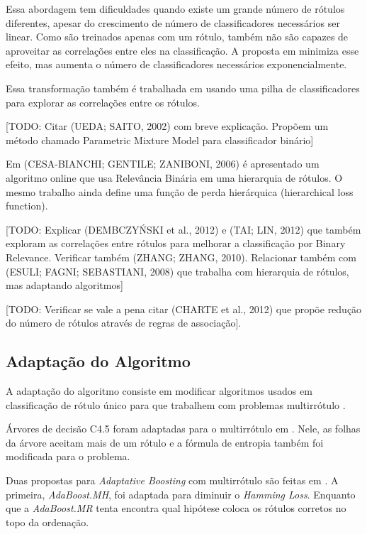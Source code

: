 \documentclass[runningheads,a4paper]{llncs}
\begin{document}
Essa abordagem tem dificuldades quando existe um grande número de rótulos diferentes, apesar do crescimento de número de classificadores necessários ser linear. Como são treinados apenas com um rótulo, também não são capazes de aproveitar as correlações entre eles na classificação. A proposta em \cite{Hullermeier2008-co} minimiza esse efeito, mas aumenta o número de classificadores necessários exponencialmente.

Essa transformação também é trabalhada em \cite{Tsoumakas2009-ex} usando uma pilha de classificadores para explorar as correlações entre os rótulos.

[TODO: Citar (UEDA; SAITO, 2002)\cite{Ueda2002-gd} com breve explicação. Propõem um método chamado Parametric Mixture Model para classificador binário]

Em (CESA-BIANCHI; GENTILE; ZANIBONI, 2006) \cite{Cesa-Bianchi2006-fk} é apresentado um algoritmo online que usa Relevância Binária em uma hierarquia de rótulos. O mesmo trabalho ainda define uma função de perda hierárquica (hierarchical loss function).

[TODO: Explicar (DEMBCZYŃSKI et al., 2012)\cite{Dembczynski2012-tv} e (TAI; LIN, 2012)\cite{Tai2012-xa} que também exploram as correlações entre rótulos para melhorar a classificação por Binary Relevance. Verificar também (ZHANG; ZHANG, 2010)\cite{Zhang2010-ee}. Relacionar também com (ESULI; FAGNI; SEBASTIANI, 2008) \cite{Esuli2008-on} que trabalha com hierarquia de rótulos, mas adaptando algoritmos]

[TODO: Verificar se vale a pena citar (CHARTE et al., 2012)\cite{Charte2012-tw} que propõe redução do número de rótulos através de regras de associação].

\subsection{Adaptação do Algoritmo}\label{subsec:adaptacao}

A adaptação do algoritmo consiste em modificar algoritmos usados em classificação de rótulo único para que trabalhem com problemas multirrótulo \cite{Tsoumakas2007-cw}.

Árvores de decisão C4.5 foram adaptadas para o multirrótulo em \cite{Clare2001-tq}. Nele, as folhas da árvore aceitam mais de um rótulo e a fórmula de entropia também foi modificada para o problema.

Duas propostas para \textit{Adaptative Boosting} com multirrótulo são feitas em \cite{Schapire2000-yt}. A primeira, \textit{AdaBoost.MH}, foi adaptada para diminuir o \textit{Hamming Loss}. Enquanto que a \textit{AdaBoost.MR} tenta encontra qual hipótese coloca os rótulos corretos no topo da ordenação.
\end{document}
